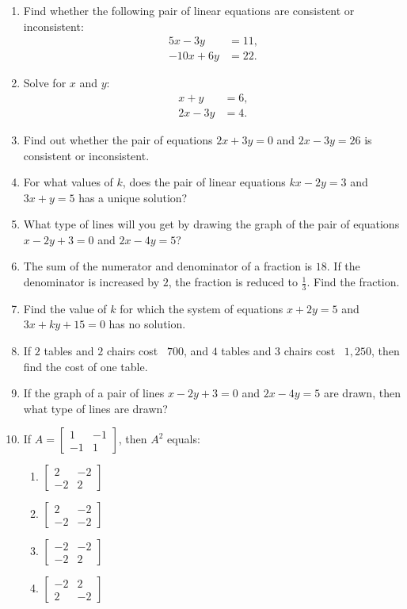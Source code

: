 \documentclass{article}
\providecommand{\myvec}[1]{\ensuremath{\begin{bmatrix}#1\end{bmatrix}}}
\begin{document}
\begin{enumerate}
    \item Find whether the following pair of linear equations are consistent or inconsistent:
    \begin{align*}
     5x - 3y &= 11, \\
    -10x + 6y &= 22.
    \end{align*}
    
    \item Solve for $x$ and $y$:
    \begin{align*}
    x + y &= 6, \\
    2x - 3y &= 4.
    \end{align*}
    
    \item Find out whether the pair of equations $2x + 3y = 0$ and $2x - 3y = 26$ is consistent or inconsistent.
    
    \item For what values of $k$, does the pair of linear equations $kx - 2y = 3$ and $3x + y = 5$ has a unique solution?
    
    \item What type of lines will you get by drawing the graph of the pair of equations $x - 2y + 3 = 0$ and $2x - 4y = 5$?
    
    \item The sum of the numerator and denominator of a fraction is $18$. If the denominator is increased by $2$, the fraction is reduced to $\frac{1}{3}$. Find the fraction.
    
    \item Find the value of $k$ for which the system of equations $x + 2y = 5$ and $3x + ky + 15 = 0$ has no solution.
    
    \item If $2$ tables and $2$ chairs cost \rupee~$700$, and $4$ tables and $3$ chairs cost \rupee~$1,250$, then find the cost of one table.
    
    \item If the graph of a  pair of lines $x - 2y + 3 = 0$ and $2x - 4y = 5$ are drawn, then what type of lines are drawn?

    \item If $A = \myvec{1 & -1 \\ -1 & 1}$, then $A^2$ equals:
    \begin{enumerate}
        \item $\myvec{2 & -2 \\ -2 & 2}$
        \item $\myvec{2 & -2 \\ -2 & -2}$
        \item $\myvec{-2 & -2 \\ -2 & 2}$
        \item $\myvec{-2 & 2 \\ 2 & -2}$
    \end{enumerate}


\end{enumerate}
\end{document}
